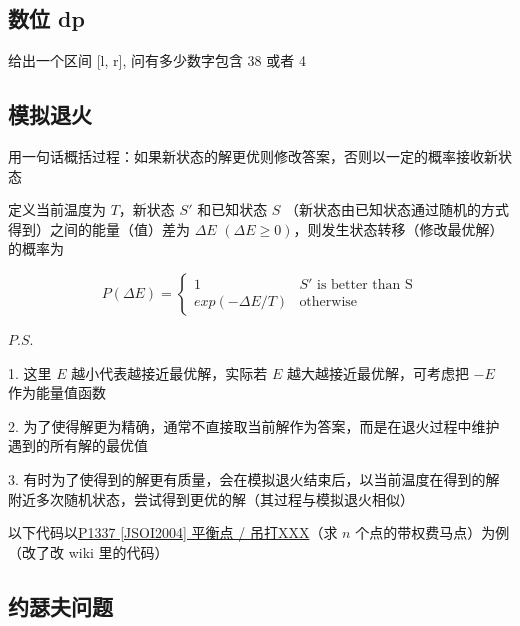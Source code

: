 \documentclass[12pt]{article}
\theoremstyle{definition}
\theoremstyle{remark}
\begin{document}
\newpage

\subsection{数位 dp}

给出一个区间 [l, r], 问有多少数字包含 38 或者 4



\newpage

\subsection{模拟退火}

    \hspace{2em} 用一句话概括过程：如果新状态的解更优则修改答案，否则以一定的概率接收新状态

    \hspace{2em} 定义当前温度为 $T$，新状态 $S'$ 和已知状态 $S$ （新状态由已知状态通过随机的方式得到）之间的能量（值）差为 $\Delta E$ $(\Delta E\ge0)$，则发生状态转移（修改最优解）的概率为

$$
P(\Delta E)=
\begin{cases}
	1 & S'\text{ is better than S}\\
	exp(-\Delta E/T) & \text{otherwise}
\end{cases}
$$

$P.S.$ 

    \hspace{2em} 1. 这里 $E$ 越小代表越接近最优解，实际若 $E$ 越大越接近最优解，可考虑把 $-E$ 作为能量值函数

    \hspace{2em} 2. 为了使得解更为精确，通常不直接取当前解作为答案，而是在退火过程中维护遇到的所有解的最优值

    \hspace{2em} 3. 有时为了使得到的解更有质量，会在模拟退火结束后，以当前温度在得到的解附近多次随机状态，尝试得到更优的解（其过程与模拟退火相似）

    \hspace{2em} 以下代码以\href{https://www.luogu.com.cn/problem/P1337}{P1337 [JSOI2004] 平衡点 / 吊打XXX}（求 $n$ 个点的带权费马点）为例（改了改 wiki 里的代码）



\subsection{约瑟夫问题}
\end{document}
